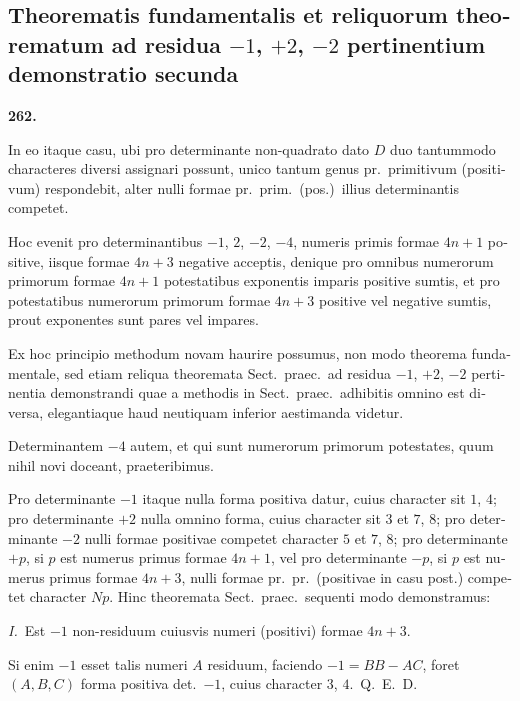 \documentclass[12pt,a4paper]{article}
\theoremstyle{plain}
\theoremstyle{definition}
\theoremstyle{remark}
\begin{document}
\begin{otherlanguage}{latin}
\bigskip

\subsection*{Theorematis fundamentalis et reliquorum theorematum ad residua $-1$, $+2$, $-2$ pertinentium demonstratio secunda}

\textbf{262.}

In eo itaque casu, ubi pro determinante non-quadrato dato $D$ duo tantummodo characteres diversi assignari possunt, unico tantum genus pr.\ primitivum (positivum) respondebit, alter nulli formae pr.\ prim.\ (pos.)\ illius determinantis competet.

Hoc evenit pro determinantibus $-1$, $2$, $-2$, $-4$, numeris primis formae $4n+1$ positive, iisque formae $4n+3$ negative acceptis, denique pro omnibus numerorum primorum formae $4n+1$ potestatibus exponentis imparis positive sumtis, et pro potestatibus numerorum primorum formae $4n+3$ positive vel negative sumtis, prout exponentes sunt pares vel impares.

Ex hoc principio methodum novam haurire possumus, non modo theorema fundamentale, sed etiam reliqua theoremata Sect.\ praec.\ ad residua $-1$, $+2$, $-2$ pertinentia demonstrandi quae a methodis in Sect.\ praec.\ adhibitis omnino est diversa, elegantiaque haud neutiquam inferior aestimanda videtur.

Determinantem $-4$ autem, et qui sunt numerorum primorum potestates, quum nihil novi doceant, praeteribimus.

Pro determinante $-1$ itaque nulla forma positiva datur, cuius character sit $1$, $4$; pro determinante $+2$ nulla omnino forma, cuius character sit $3$ et $7$, $8$; pro determinante $-2$ nulli formae positivae competet character $5$ et $7$, $8$; pro determinante $+p$, si $p$ est numerus primus formae $4n+1$, vel pro determinante $-p$, si $p$ est numerus primus formae $4n+3$, nulli formae pr.\ pr.\ (positivae in casu post.) competet character $Np$. Hinc theoremata Sect.\ praec.\ sequenti modo demonstramus:

\smallskip

\textit{I.}\ Est $-1$ non-residuum cuiusvis numeri (positivi) formae $4n+3$.

Si enim $-1$ esset talis numeri $A$ residuum, faciendo $-1 = BB - AC$, foret $(A, B, C)$ forma positiva det.\ $-1$, cuius character $3$, $4$.~\hfill Q.\ E.\ D.


\end{otherlanguage}
\end{document}
